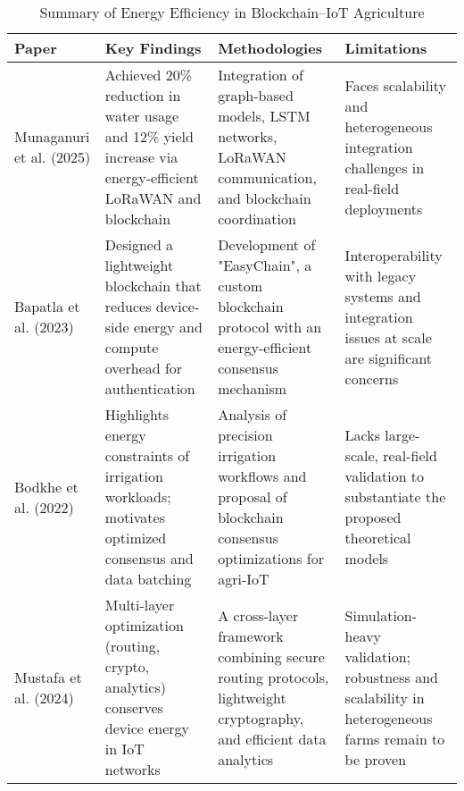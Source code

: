 \documentclass[12pt,onecolumn]{IEEEtran} %
\newcommand{\fitToPage}[1]{\begin{adjustbox}{max width=\textwidth}#1\end{adjustbox}}
\renewcommand{\arraystretch}{1.2} %
\begin{document}
\begin{table}[H]
\caption{Summary of Energy Efficiency in Blockchain–IoT Agriculture}
\label{table:energy}
\centering
\fitToPage{
\begingroup
\setlength{\tabcolsep}{4pt}
\renewcommand{\arraystretch}{1.15}
\footnotesize
\begin{tabularx}{\textwidth}{@{}P{0.18\textwidth}YYY@{}}
\toprule
\textbf{Paper} & \textbf{Key Findings} & \textbf{Methodologies} & \textbf{Limitations} \\
\midrule
Munaganuri et al. (2025) & Achieved 20\% reduction in water usage and 12\% yield increase via energy-efficient LoRaWAN and blockchain & Integration of graph-based models, LSTM networks, LoRaWAN communication, and blockchain coordination & Faces scalability and heterogeneous integration challenges in real-field deployments \\
\addlinespace
Bapatla et al. (2023) & Designed a lightweight blockchain that reduces device-side energy and compute overhead for authentication & Development of "EasyChain", a custom blockchain protocol with an energy-efficient consensus mechanism & Interoperability with legacy systems and integration issues at scale are significant concerns \\
\addlinespace
Bodkhe et al. (2022) & Highlights energy constraints of irrigation workloads; motivates optimized consensus and data batching & Analysis of precision irrigation workflows and proposal of blockchain consensus optimizations for agri-IoT & Lacks large-scale, real-field validation to substantiate the proposed theoretical models \\
\addlinespace
Mustafa et al. (2024) & Multi-layer optimization (routing, crypto, analytics) conserves device energy in IoT networks & A cross-layer framework combining secure routing protocols, lightweight cryptography, and efficient data analytics & Simulation-heavy validation; robustness and scalability in heterogeneous farms remain to be proven \\
\bottomrule
\end{tabularx}
\endgroup
}
\end{table}
\end{document}
